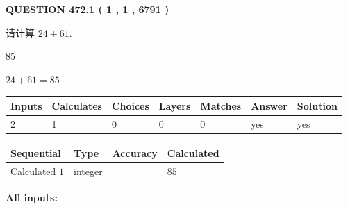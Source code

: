 \documentclass{ctexart}
\begin{document}
\vspace{0.2in}
  
{\textbf{\Large{QUESTION
472.1 
 ( 1 , 1 , 6791 )
}}}
  
  
 
请计算 $ %
24 +  %
61 $.
 
 
 
\noindent{}
 
 

85
 
 
\noindent{}
 
 

 
 
 
\noindent{}
 
 

$ %
24 +  %
61=   %
85$
 
 
\noindent{}
 
 

 
   
   
   
   
\noindent\begin{tabular}{|l|l|l|l|l|l|l|}
 \hline
Inputs & Calculates & Choices & Layers & Matches & Answer & Solution \\ \hline
 2  & 
 1  & 
 0
  & 
 0  & 
 0  & 
  yes & 
  yes 
  \\ \hline
 \end{tabular}
   
   
   
   
\noindent{}
   
   
  
  
\noindent\begin{tabular}{|l|l|l|l|}
\hline
 Sequential & Type & Accuracy & Calculated \\ 
\hline
 
 
  Calculated $  1 $ & integer &  & 
  $ 85 $ 
 \\  \hline  
 \end{tabular}
   
   
   
   
\noindent\vspace{0.1in}\hspace{-0.08in} {\textbf{\Large{All inputs: }}}
   
\end{document}
